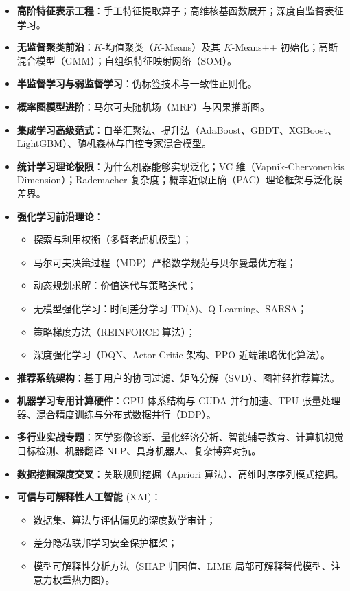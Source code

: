 \begin{itemize}
\begin{itemize}
        \item 循环神经网络（RNN、LSTM、GRU）与时间反向传播（BPTT）；
        \item 特征表示迁移、预训练微调与领域自适应；
        \item 对抗训练与生成对抗网络（GAN）。
    \end{itemize}
    \item \textbf{高阶特征表示工程}：手工特征提取算子；高维核基函数展开；深度自监督表征学习。
    \item \textbf{无监督聚类前沿}：$K$-均值聚类（$K$-Means）及其 $K$-Means++ 初始化；高斯混合模型（GMM）；自组织特征映射网络（SOM）。
    \item \textbf{半监督学习与弱监督学习}：伪标签技术与一致性正则化。
    \item \textbf{概率图模型进阶}：马尔可夫随机场（MRF）与因果推断图。
    \item \textbf{集成学习高级范式}：自举汇聚法、提升法（AdaBoost、GBDT、XGBoost、LightGBM）、随机森林与门控专家混合模型。
    \item \textbf{统计学习理论极限}：为什么机器能够实现泛化；VC 维（Vapnik-Chervonenkis Dimension）；Rademacher 复杂度；概率近似正确（PAC）理论框架与泛化误差界。
    \item \textbf{强化学习前沿理论}：
    \begin{itemize}
        \item 探索与利用权衡（多臂老虎机模型）；
        \item 马尔可夫决策过程（MDP）严格数学规范与贝尔曼最优方程；
        \item 动态规划求解：价值迭代与策略迭代；
        \item 无模型强化学习：时间差分学习 TD($\lambda$)、Q-Learning、SARSA；
        \item 策略梯度方法（REINFORCE 算法）；
        \item 深度强化学习（DQN、Actor-Critic 架构、PPO 近端策略优化算法）。
    \end{itemize}
    \item \textbf{推荐系统架构}：基于用户的协同过滤、矩阵分解（SVD）、图神经推荐算法。
    \item \textbf{机器学习专用计算硬件}：GPU 体系结构与 CUDA 并行加速、TPU 张量处理器、混合精度训练与分布式数据并行（DDP）。
    \item \textbf{多行业实战专题}：医学影像诊断、量化经济分析、智能辅导教育、计算机视觉目标检测、机器翻译 NLP、具身机器人、复杂博弈对抗。
    \item \textbf{数据挖掘深度交叉}：关联规则挖掘（Apriori 算法）、高维时序序列模式挖掘。
    \item \textbf{可信与可解释性人工智能} (XAI)：
    \begin{itemize}
        \item 数据集、算法与评估偏见的深度数学审计；
        \item 差分隐私联邦学习安全保护框架；
        \item 模型可解释性分析方法（SHAP 归因值、LIME 局部可解释替代模型、注意力权重热力图）。
    \end{itemize}
\end{itemize}

